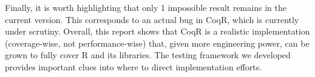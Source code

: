 \documentclass[
    sigplan,
    10pt,
    review, %
    natbib=false %
 ]{acmart}
\newcommand\mb[1]{\todo[color=purple!20,size=\scriptsize]{#1}}
\newcommand\mbi[1]{\todo[color=purple!20,inline]{#1}}
\newcommand\et[1]{\todo[color=blue!20,size=\scriptsize]{#1}}
\newcommand\CoqR{CoqR}
\newcommand\newtext[1]{{\color{blue} #1}}
\begin{document}
Finally, it is worth highlighting that only 1 \textsf{impossible} result remains in the current version.  This corresponds to an actual bug in \CoqR{}, which is currently under scrutiny.
Overall, this report shows that \CoqR{} is a realistic implementation \newtext{(coverage-wise, not performance-wise)} that, given more engineering power, can be grown to fully cover R and its libraries. The testing framework we developed provides important clues into where to direct implementation efforts.





%
%

\end{document}
